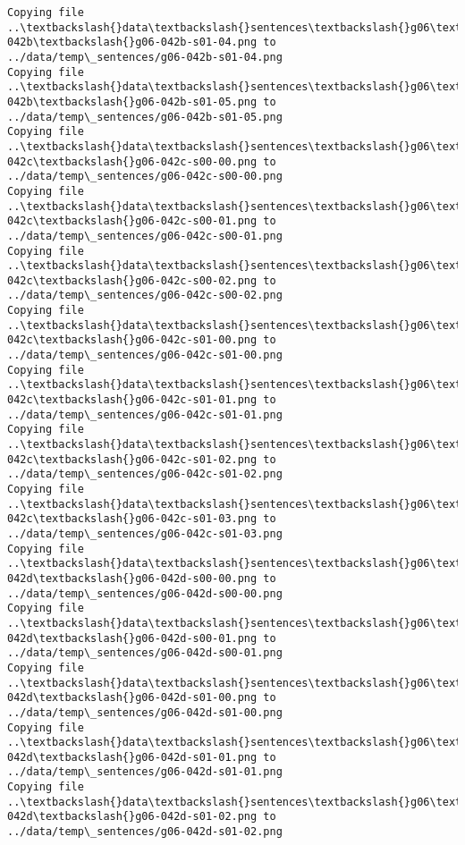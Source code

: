 \documentclass[11pt]{article}
\begin{document}
\begin{Verbatim}[commandchars=\\\{\}]
Copying file ..\textbackslash{}data\textbackslash{}sentences\textbackslash{}g06\textbackslash{}g06-042b\textbackslash{}g06-042b-s01-04.png to
../data/temp\_sentences/g06-042b-s01-04.png
Copying file ..\textbackslash{}data\textbackslash{}sentences\textbackslash{}g06\textbackslash{}g06-042b\textbackslash{}g06-042b-s01-05.png to
../data/temp\_sentences/g06-042b-s01-05.png
Copying file ..\textbackslash{}data\textbackslash{}sentences\textbackslash{}g06\textbackslash{}g06-042c\textbackslash{}g06-042c-s00-00.png to
../data/temp\_sentences/g06-042c-s00-00.png
Copying file ..\textbackslash{}data\textbackslash{}sentences\textbackslash{}g06\textbackslash{}g06-042c\textbackslash{}g06-042c-s00-01.png to
../data/temp\_sentences/g06-042c-s00-01.png
Copying file ..\textbackslash{}data\textbackslash{}sentences\textbackslash{}g06\textbackslash{}g06-042c\textbackslash{}g06-042c-s00-02.png to
../data/temp\_sentences/g06-042c-s00-02.png
Copying file ..\textbackslash{}data\textbackslash{}sentences\textbackslash{}g06\textbackslash{}g06-042c\textbackslash{}g06-042c-s01-00.png to
../data/temp\_sentences/g06-042c-s01-00.png
Copying file ..\textbackslash{}data\textbackslash{}sentences\textbackslash{}g06\textbackslash{}g06-042c\textbackslash{}g06-042c-s01-01.png to
../data/temp\_sentences/g06-042c-s01-01.png
Copying file ..\textbackslash{}data\textbackslash{}sentences\textbackslash{}g06\textbackslash{}g06-042c\textbackslash{}g06-042c-s01-02.png to
../data/temp\_sentences/g06-042c-s01-02.png
Copying file ..\textbackslash{}data\textbackslash{}sentences\textbackslash{}g06\textbackslash{}g06-042c\textbackslash{}g06-042c-s01-03.png to
../data/temp\_sentences/g06-042c-s01-03.png
Copying file ..\textbackslash{}data\textbackslash{}sentences\textbackslash{}g06\textbackslash{}g06-042d\textbackslash{}g06-042d-s00-00.png to
../data/temp\_sentences/g06-042d-s00-00.png
Copying file ..\textbackslash{}data\textbackslash{}sentences\textbackslash{}g06\textbackslash{}g06-042d\textbackslash{}g06-042d-s00-01.png to
../data/temp\_sentences/g06-042d-s00-01.png
Copying file ..\textbackslash{}data\textbackslash{}sentences\textbackslash{}g06\textbackslash{}g06-042d\textbackslash{}g06-042d-s01-00.png to
../data/temp\_sentences/g06-042d-s01-00.png
Copying file ..\textbackslash{}data\textbackslash{}sentences\textbackslash{}g06\textbackslash{}g06-042d\textbackslash{}g06-042d-s01-01.png to
../data/temp\_sentences/g06-042d-s01-01.png
Copying file ..\textbackslash{}data\textbackslash{}sentences\textbackslash{}g06\textbackslash{}g06-042d\textbackslash{}g06-042d-s01-02.png to
../data/temp\_sentences/g06-042d-s01-02.png

\end{Verbatim}
\end{document}
